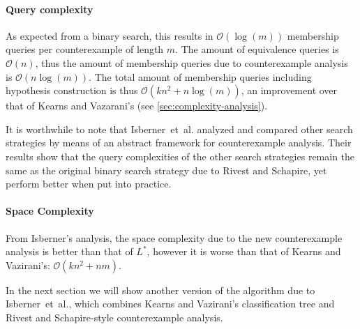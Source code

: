 \documentclass[multi,crop=false,class=article]{standalone}
\begin{document}
\paragraph{Query complexity} As expected from a binary search, this results in
$\mathcal{O}(\log(m))$ membership queries per counterexample of length $m$. The
amount of equivalence queries is $\mathcal{O}(n)$, thus the amount of membership
queries due to counterexample analysis is $\mathcal{O}(n\log(m))$. The total
amount of membership queries including hypothesis construction is thus
$\mathcal{O}(kn^2 + n\log(m))$, an improvement over that of Kearns and
Vazarani's (see \cref{sec:complexity-analysis}).

It is worthwhile to note that Isberner~et~al. analyzed and compared other search
strategies by means of an abstract framework for counterexample
analysis\cite{Isberner2014a}. Their results show that the query complexities of
the other search strategies remain the same as the original binary search
strategy due to Rivest and Schapire, yet perform better when put into practice.

\paragraph{Space Complexity} From Isberner's analysis\cite{Isberner2014b}, the
space complexity due to the new counterexample analysis is better than that of
$L^*$, however it is worse than that of Kearns and Vazirani's:
$\mathcal{O}(kn^2 + nm)$.

In the next section we will show another version of the algorithm due to
Isberner~et~al., which combines Kearns and Vazirani's classification tree and
Rivest and Schapire-style counterexample analysis.  
\end{document}
